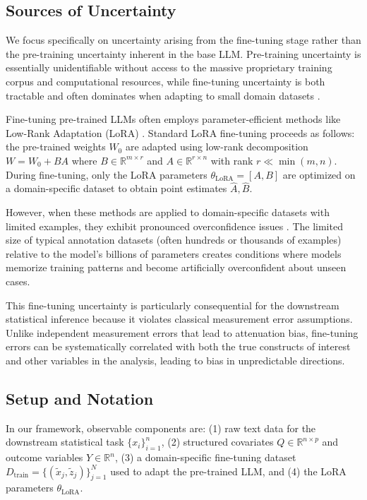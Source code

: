 \documentclass[11pt]{article}
\begin{document}
\subsection{Sources of Uncertainty}

We focus specifically on uncertainty arising from the fine-tuning stage rather than 
the pre-training uncertainty inherent in the base LLM. 
Pre-training uncertainty is essentially unidentifiable without access 
to the massive proprietary training corpus and computational resources, 
while fine-tuning uncertainty is both tractable and often dominates 
when adapting to small domain datasets \citep{kong2020calibrating, yang2023bayesian, xiong2024llms}.

Fine-tuning pre-trained LLMs often employs parameter-efficient methods like Low-Rank Adaptation (LoRA) \citep{hu2022lora}. 
Standard LoRA fine-tuning proceeds as follows: 
the pre-trained weights $W_0$ are adapted using low-rank decomposition $W = W_0 + BA$ where $B \in \mathbb{R}^{m \times r}$ and $A \in \mathbb{R}^{r \times n}$ with rank $r \ll \min(m, n)$. 
During fine-tuning, only the LoRA parameters $\theta_{\text{LoRA}} = [A, B]$ 
are optimized on a domain-specific dataset to obtain point estimates $\hat{A}, \hat{B}$.

However, when these methods are applied to domain-specific datasets with limited examples, 
they exhibit pronounced overconfidence issues \citep{yang2023bayesian, wang2024blob}. 
The limited size of typical annotation datasets (often hundreds or thousands of examples) 
relative to the model's billions of parameters creates conditions where models memorize training patterns 
and become artificially overconfident about unseen cases.

This fine-tuning uncertainty is particularly consequential for the downstream statistical inference 
because it violates classical measurement error assumptions. 
Unlike independent measurement errors that lead to attenuation bias, 
fine-tuning errors can be systematically correlated with both the true constructs of interest 
and other variables in the analysis, leading to bias in unpredictable directions.

\subsection{Setup and Notation}

In our framework, observable components are:
(1) raw text data for the downstream statistical task $\{x_i\}_{i=1}^n$, 
(2) structured covariates $Q \in \mathbb{R}^{n \times p}$ and outcome variables $Y \in \mathbb{R}^n$,
(3) a domain-specific fine-tuning dataset $D_{\text{train}} = \{(\tilde{x}_j, \tilde{z}_j)\}_{j=1}^N$ used to adapt the pre-trained LLM, and 
(4) the LoRA parameters $\theta_{\text{LoRA}}$.
\end{document}
